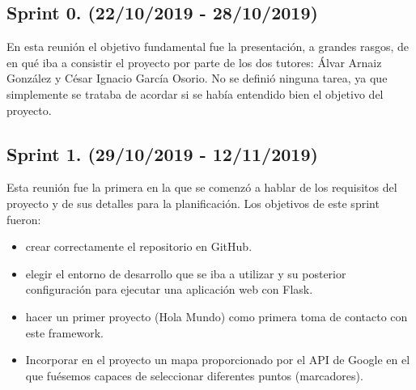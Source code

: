 \subsection{Sprint 0. (22/10/2019 - 28/10/2019)}
En esta reunión el objetivo fundamental fue la presentación, a grandes rasgos, de en qué iba a consistir el proyecto por parte de los dos tutores: Álvar Arnaiz González y César Ignacio García Osorio.
No se definió ninguna tarea, ya que simplemente se trataba de acordar si se había entendido bien el objetivo del proyecto.

\subsection{Sprint 1. (29/10/2019 - 12/11/2019)}
Esta reunión fue la primera en la que se comenzó a hablar de los requisitos del proyecto y de sus detalles para la planificación.
Los objetivos de este sprint fueron:
\begin{itemize}
	\item crear correctamente el repositorio en GitHub.
	\item elegir el entorno de desarrollo que se iba a utilizar y su posterior configuración para ejecutar una aplicación web con Flask.
	\item hacer un primer proyecto (Hola Mundo) como primera toma de contacto con este framework.
	\item Incorporar en el proyecto un mapa proporcionado por el API de Google en el que fuésemos capaces de seleccionar diferentes puntos (marcadores).
\end{itemize}


